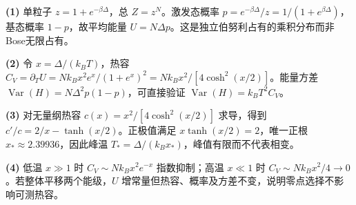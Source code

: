 \par\noindent\textbf{(1)} 单粒子 \(z=1+e^{-\beta\Delta}\)，总 \(Z=z^N\)。激发态概率 \(p=e^{-\beta\Delta}/z=1/(1+e^{\beta\Delta})\)，基态概率 \(1-p\)，故平均能量 \(U=N\Delta p\)。这是独立伯努利占有的乘积分布而非Bose无限占有。
\par\noindent\textbf{(2)} 令 \(x=\Delta/(k_BT)\)，热容 \(C_V=\partial_TU=Nk_Bx^2e^x/(1+e^x)^2=Nk_Bx^2/[4\cosh^2(x/2)]\)。能量方差 \(\operatorname{Var}(H)=N\Delta^2p(1-p)\)，可直接验证 \(\operatorname{Var}(H)=k_BT^2C_V\)。
\par\noindent\textbf{(3)} 对无量纲热容 \(c(x)=x^2/[4\cosh^2(x/2)]\) 求导，得到 \(c'/c=2/x-\tanh(x/2)\)。正极值满足 \(x\tanh(x/2)=2\)，唯一正根 \(x_*\approx2.39936\)，因此峰温 \(T_*=\Delta/(k_Bx_*)\)，峰值有限而不代表相变。
\par\noindent\textbf{(4)} 低温 \(x\gg1\) 时 \(C_V\sim Nk_Bx^2e^{-x}\) 指数抑制；高温 \(x\ll1\) 时 \(C_V\sim Nk_Bx^2/4\to0\)。若整体平移两个能级，\(U\) 增常量但热容、概率及方差不变，说明零点选择不影响可测热容。
